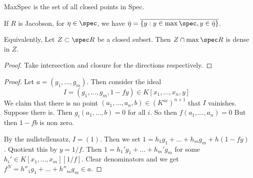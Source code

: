 MaxSpec is the set of all closed points in Spec.

If $R$ is Jacobson, for $\eta \in \spec$, we have $\bar{\eta}=\overline{\{y:y\in \max\spec ,y\in \bar{\eta}\}}$.


Equivalently, Let $Z\subset \spec R$ be a closed subset. Then $Z\cap \max\spec R$ is dense in $Z$.


\begin{proof}
    Take intersection and closure for the directions respectively.
\end{proof}
\begin{proof}
    Let $a=(g_1,...,g_m)$. Then consider the ideal \[
    I=(g_1,...,g_m, 1-fy)\in K[x_1,...,x_n,y]
    \]
    We claim that there is no point $(a_1,...,a_n,b)\in (K^{ac})^{n+1}$ that $I$ vainishes. 
    Suppose there is. Then $g_i(a_1,...,b)=0$ for all $i$. So then $f(a_1,...,a_n)=0$ But then $1-fb$ is non zero. 

    By the nullstellensatz, $I=(1)$. Then we set $1=h_1g_1+...+h_mg_m+h(1-fy)$. Quotient this by $y=1/f$. Then $1=h_1'g_1+...+h_m'g_m$ for some $h_i'\in K[x_1,...,x_m][1/f]$. Clear denominators and we get $f^N=h''_1g_1+...+h''_mg_m\in a$.
\end{proof}